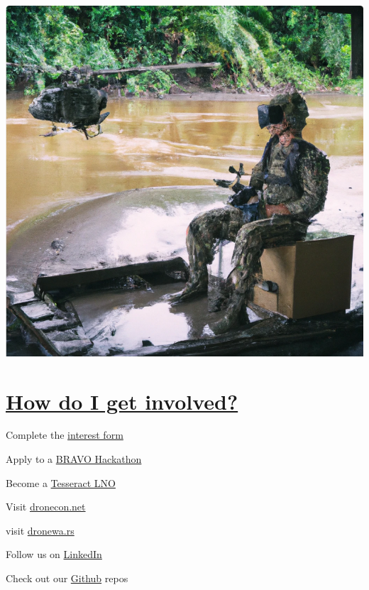 \documentclass[a4paper]{article}
\begin{document}
{\begin{multicols}{2}
    \columnbreak

        \includegraphics[width=\linewidth]{images/green-man.jpg}
        
		\section{\underline{How do I get involved?}}

			
		\begin{compactitem}
			\item Complete the \href{https://forms.office.com/r/6H6wFBtK5a}{interest form}
			\item Apply to a \href{https://bravo.il2.afwerx.dso.mil/}{BRAVO Hackathon}
			\item Become a \href{https://www.tesseract.af.mil/Network/}{Tesseract LNO} \newline
                \item Visit \href{https://dronecon.net}{dronecon.net}
                \item visit \href{https://dronewa.rs/details}{dronewa.rs}
                \item Follow us on \href{https://www.linkedin.com/company/dronecon-hackathon/}{LinkedIn}
                \item Check out our \href{https://github.com/orgs/Dronewa-rs/repositories}{Github} repos

		\end{compactitem}
    
    \end{multicols}
}
\end{document}
